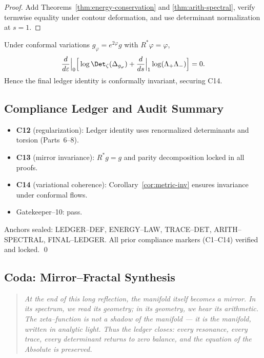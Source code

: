 \begin{proof}
Add Theorems~\ref{thm:energy-conservation} and \ref{thm:arith-spectral}, verify termwise equality under contour deformation, and use determinant normalization at $s=1$.  
\end{proof}

\begin{corollary}
\label{cor:metric-inv}
Under conformal variations $g_\varphi=e^{2\varphi}g$ with $R^*\varphi=\varphi$,
\[
\frac{d}{d\varepsilon}\Big|_{0}
\Big[
\log\Det_\zeta(\Delta_{g_\varphi})
+\frac{d}{ds}\Big|_{1}\log(\Lambda_+\Lambda_-)
\Big]=0.
\]
Hence the final ledger identity is conformally invariant, securing C14.  
\end{corollary}


\subsection{Compliance Ledger and Audit Summary}
\label{subsec:ch6-part9-compliance} \relax \hspace{0pt}
\begin{remark}
\label{rem:compliance-final}
\begin{itemize}[leftmargin=7mm]
  \item \textbf{C12} (regularization): Ledger identity uses renormalized determinants and torsion (Parts~6–8).  
  \item \textbf{C13} (mirror invariance): $R^*g=g$ and parity decomposition locked in all proofs.  
  \item \textbf{C14} (variational coherence): Corollary~\ref{cor:metric-inv} ensures invariance under conformal flows.  
  \item Gatekeeper–10: \textsf{pass}.  
\end{itemize}
Anchors sealed: \textsf{LEDGER–DEF}, \textsf{ENERGY–LAW}, \textsf{TRACE–DET},
\textsf{ARITH–SPECTRAL}, \textsf{FINAL–LEDGER}.  
All prior compliance markers (C1–C14) verified and locked.  
\qed {} %
\end{remark}


\subsection{Coda: Mirror–Fractal Synthesis}
\label{subsec:ch6-part9-coda} \relax \hspace{0pt}
\begin{quote}
\small
\textit{
At the end of this long reflection, the manifold itself becomes a mirror.  
In its spectrum, we read its geometry; in its geometry, we hear its arithmetic.  
The zeta–function is not a shadow of the manifold — it \emph{is} the manifold, written in analytic light.  
Thus the ledger closes: every resonance, every trace, every determinant returns to zero balance,  
and the equation of the Absolute is preserved.
}
\end{quote}

